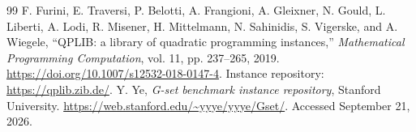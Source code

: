 \documentclass[11pt,a4paper]{article}
\begin{document}
\begin{thebibliography}{99}
 F. Furini, E. Traversi, P. Belotti, A. Frangioni, A. Gleixner, N. Gould, L. Liberti, A. Lodi, R. Misener, H. Mittelmann, N. Sahinidis, S. Vigerske, and A. Wiegele, ``QPLIB: a library of quadratic programming instances,'' \textit{Mathematical Programming Computation}, vol. 11, pp. 237--265, 2019. \url{https://doi.org/10.1007/s12532-018-0147-4}. Instance repository: \url{https://qplib.zib.de/}.
 Y. Ye, \textit{G-set benchmark instance repository}, Stanford University. \url{https://web.stanford.edu/~yyye/yyye/Gset/}. Accessed September 21, 2026.
\end{thebibliography}
\end{document}
